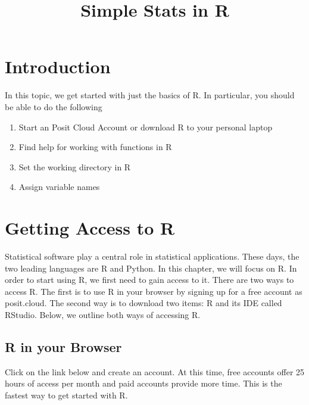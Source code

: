 \documentclass[11pt]{amsart}
\title{Simple Stats in R}
\renewcommand{\(}{\left(}
\renewcommand{\)}{\right)}
\begin{document}
\thispagestyle{empty}
\maketitle


\section{Introduction}

In this topic, we get started with just the basics of R. In particular, you should be able to do the following

\begin{enumerate}
\item Start an Posit Cloud Account or download R to your personal laptop
\item Find help for working with functions in R
\item Set the working directory in R
\item Assign variable names 
\end{enumerate}

\section{Getting Access to R}

Statistical software play a central role in statistical applications.
These days, the two leading languages are R and Python. In this
chapter, we will focus on R. In order to start using R, we first need
to gain access to it.  There are two ways to access R.  The first is
to use R in your browser by signing up for a free account as
posit.cloud.  The second way is to download two items: R and its IDE
called RStudio.  Below, we outline both ways of accessing R.

\subsection{R in your Browser}

Click on the link below and create an account.  At this time, free
accounts offer 25 hours of access per month and paid accounts provide
more time. This is the fastest way to get started with R.
\end{document}
